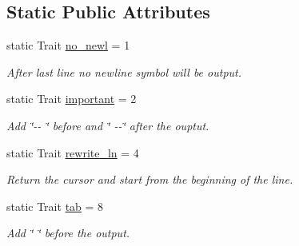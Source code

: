 \subsection*{\-Static \-Public \-Attributes}
\begin{DoxyCompactItemize}
\item 
\hypertarget{classOutputStreamer_ac71ea1199278b1d27f8e02961e03324c}{static \-Trait \hyperlink{classOutputStreamer_ac71ea1199278b1d27f8e02961e03324c}{no\-\_\-newl} = 1}\label{classOutputStreamer_ac71ea1199278b1d27f8e02961e03324c}

\begin{DoxyCompactList}\small\item\em \-After last line no newline symbol will be output. \end{DoxyCompactList}\item 
\hypertarget{classOutputStreamer_a8c74dcf725523c8c1d310f3bcbebd58d}{static \-Trait \hyperlink{classOutputStreamer_a8c74dcf725523c8c1d310f3bcbebd58d}{important} = 2}\label{classOutputStreamer_a8c74dcf725523c8c1d310f3bcbebd58d}

\begin{DoxyCompactList}\small\item\em \-Add \char`\"{}-\/-\/ \char`\"{} before and \char`\"{} -\/-\/\char`\"{} after the ouptut. \end{DoxyCompactList}\item 
\hypertarget{classOutputStreamer_a96c1c4303f014a6eb83ab9635b783419}{static \-Trait \hyperlink{classOutputStreamer_a96c1c4303f014a6eb83ab9635b783419}{rewrite\-\_\-ln} = 4}\label{classOutputStreamer_a96c1c4303f014a6eb83ab9635b783419}

\begin{DoxyCompactList}\small\item\em \-Return the cursor and start from the beginning of the line. \end{DoxyCompactList}\item 
\hypertarget{classOutputStreamer_a993dfcb1247662943e1d45fac9e323d6}{static \-Trait \hyperlink{classOutputStreamer_a993dfcb1247662943e1d45fac9e323d6}{tab} = 8}\label{classOutputStreamer_a993dfcb1247662943e1d45fac9e323d6}

\begin{DoxyCompactList}\small\item\em \-Add \char`\"{}   \char`\"{} before the output. \end{DoxyCompactList}\end{DoxyCompactItemize}


